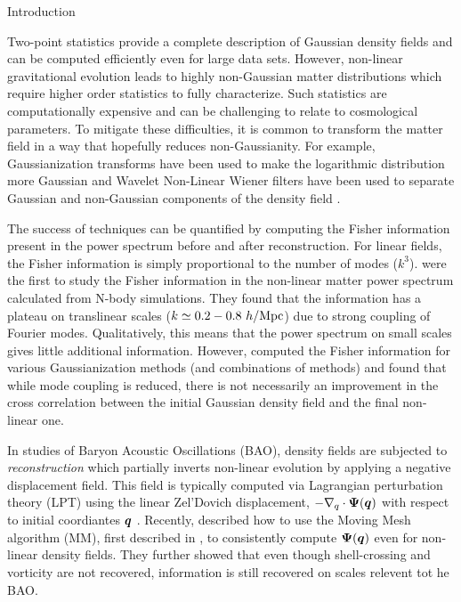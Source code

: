 \begin{section}{Introduction}\label{sec:introduction}  

  Two-point statistics provide a complete description of Gaussian
  density fields and can be computed efficiently even for large data
  sets.  However, non-linear gravitational evolution leads to highly
  non-Gaussian matter distributions which require higher order
  statistics to fully characterize.  Such statistics are
  computationally expensive and can be challenging to relate to
  cosmological parameters.  To mitigate these difficulties, it is
  common to transform the matter field in a way that hopefully reduces
  non-Gaussianity.  For example, Gaussianization transforms have been
  used to make the logarithmic distribution more Gaussian
  \cite{bib:Weinberg1992,bib:Mark2009} and Wavelet Non-Linear Wiener
  filters have been used to separate Gaussian and non-Gaussian
  components of the density field
  \cite{bib:Zhang2011,bib:Yu2012,bib:HarnoisD2013}.

  The success of techniques can be quantified by computing the Fisher
  information present in the power spectrum before and after
  reconstruction.  For linear fields, the Fisher information is simply
  proportional to the number of modes ($k^3$).  \citet{bib:Rimes2006}
  were the first to study the Fisher information in the non-linear
  matter power spectrum calculated from N-body simulations.  They
  found that the information has a plateau on translinear scales
  ($k \simeq 0.2-0.8\ h/{\rm Mpc}$) due to strong coupling of Fourier
  modes.  Qualitatively, this means that the power spectrum on small
  scales gives little additional information.  
  However, \citet{bib:HarnoisD2013} computed the Fisher information
  for various Gaussianization methods (and combinations of methods)
  and found that while mode coupling is reduced, there is not
  necessarily an improvement in the cross correlation between the
  initial Gaussian density field and the final non-linear one. 

  In studies of Baryon Acoustic Oscillations (BAO), density fields are
  subjected to {\it reconstruction} which partially inverts non-linear
  evolution by applying a negative displacement field.  This field is
  typically computed via Lagrangian perturbation theory (LPT)
  using the linear Zel'Dovich displacement, $-\nabla_q\cdot\boldsymbol\Psi(\boldsymbol q)$
  with respect to initial coordiantes $\boldsymbol{q}$ \citep{bib:Zel1970}.
  Recently, \citet{bib:Zhu2016} described how to use the Moving Mesh
  algorithm (MM), first described in \citep{bib:Pen1995,bib:Pen1998},
  to consistently compute $\boldsymbol\Psi(\boldsymbol{q})$ even for non-linear
  density fields.  They further showed that even though shell-crossing
  and vorticity are not recovered, information is still recovered on
  scales relevent tot he BAO.


\end{section}
